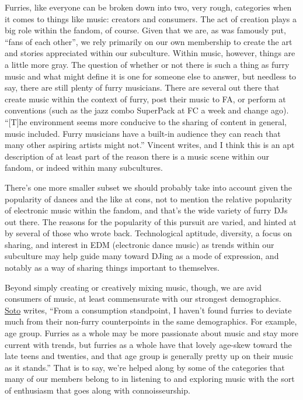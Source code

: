 Furries, like everyone can be broken down into two, very rough,
categories when it comes to things like music: creators and consumers.
The act of creation plays a big role within the fandom, of course. Given
that we are, as was famously put, ``fans of each other'', we rely
primarily on our own membership to create the art and stories
appreciated within our subculture. Within music, however, things are a
little more gray. The question of whether or not there is such a thing
as furry music and what might define it is one for someone else to
answer, but needless to say, there are still plenty of furry musicians.
There are several out there that create music within the context of
furry, post their music to FA, or perform at conventions (such as the
jazz combo SuperPack at FC a week and change ago). ``{[}T{]}he
environment seems more conducive to the sharing of content in general,
music included. Furry musicians have a built-in audience they can reach
that many other aspiring artists might not.'' Vincent writes, and I
think this is an apt description of at least part of the reason there is
a music scene within our fandom, or indeed within many subcultures.

There's one more smaller subset we should probably take into account
given the popularity of dances and the like at cons, not to mention the
relative popularity of electronic music within the fandom, and that's
the wide variety of furry DJs out there. The reasons for the popularity
of this pursuit are varied, and hinted at by several of those who wrote
back. Technological aptitude, diversity, a focus on sharing, and
interest in EDM (electronic dance music) as trends within our subculture
may help guide many toward DJing as a mode of expression, and notably as
a way of sharing things important to themselves.

Beyond simply creating or creatively mixing music, though, we are avid
consumers of music, at least commensurate with our strongest
demographics. \href{http://twitter.com/sotopnthr}{Soto} writes, ``From a
consumption standpoint, I haven't found furries to deviate much from
their non-furry counterpoints in the same demographics. For example, age
group. Furries as a whole may be more passionate about music and stay
more current with trends, but furries as a whole have that lovely
age-skew toward the late teens and twenties, and that age group is
generally pretty up on their music as it stands.'' That is to say, we're
helped along by some of the categories that many of our members belong
to in listening to and exploring music with the sort of enthusiasm that
goes along with connoisseurship.

